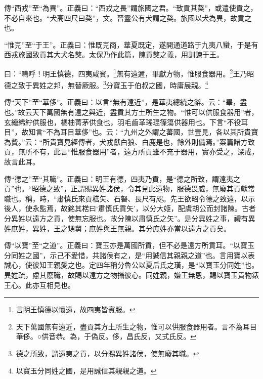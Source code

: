 {\noindent\zhuan{}\fzbyks 傳“西戎”至“為異”。正義曰：“西戎之長”謂旅國之君。“致貢其獒”，或遣使貢之，不必自來也。“犬高四尺曰獒”，文。晉靈公有犬謂之獒。旅國以犬為異，故貢之也。 \par}

{\noindent\shu{}\fzkt “惟克”至“于王”。正義曰：惟既克商，華夏既定，遂開通道路于九夷八蠻，于是有西戎旅國致貢其大犬名獒。太保乃作此篇，陳貢獒之義，用訓諫于王。 \par}

曰：“嗚呼！明王慎德，四夷咸賓。\footnote{言明王慎德以懷遠，故四夷皆賓服。}無有遠邇，畢獻方物，惟服食器用。\footnote{天下萬國無有遠近，盡貢其方土所生之物，惟可以供服食器用者。言不為耳目華侈。○供音恭。為，于偽反。侈，昌氏反，又式氏反。}王乃昭德之致于異姓之邦，無替厥服。\footnote{德之所致，謂遠夷之貢，以分賜異姓諸侯，使無廢其職。}分寶玉于伯叔之國，時庸展親。\footnote{以寶玉分同姓之國，是用誠信其親親之道。}


{\noindent\zhuan{}\fzbyks 傳“天下”至“華侈”。正義曰：以言“無有遠近”，是華夷總統之辭。云：“畢，盡也。”故云天下萬國無有遠之與近，盡貢其方土所生之物。“惟可以供服食器用”者，玄纁絺紵供服也，橘柚菁茅供食也，羽毛齒革瑤琨篠簜供器用也。下言“不役耳目”，故知言“不為耳目華侈”也。云：“九州之外謂之蕃國，世壹見，各以其所貴寶為贄。”云：“所貴寶見經傳者，犬戎獻白狼、白鹿是也，餘外則備焉。”案篇諸方致貢，無所不有，此言“惟服食器用”者，遠方所貢雖不充于器用，實亦受之，深戒，故言此耳。 \par}

{\noindent\zhuan{}\fzbyks 傳“德之”至“其職”。正義曰：明王有德，四夷乃貢，是“德之所致，謂遠夷之貢”也。“昭德之致”，正謂賜異姓諸侯，令其見此遠物，服德畏威，無廢其貢獻常職也。稱，時，“肅慎氏來貢楛矢、石砮、長尺有咫。先王欲昭令德之致遠，以示後人，使永監焉，故銘其楛曰‘肅慎氏貢矢’，以分大姬，配虞胡公而封諸陳。古者分異姓以遠方之貢，使無忘服也。故分陳以肅慎氏之矢”。是分異姓之事，禮有異姓庶姓，異姓，王之甥舅；庶姓與王無親。其分庶姓亦當以遠方之貢矣。 \par}

{\noindent\zhuan{}\fzbyks 傳“以寶”至“之道”。正義曰：寶玉亦是萬國所貢，但不必是遠方所貢耳。“以寶玉分同姓之國”，示己不愛惜，共諸侯有之，是“用誠信其親親之道”也。言用寶以表誠心，使彼知王親愛之也。定四年稱分魯公以夏后氏之璜，是“以寶玉分同姓”也。異姓疏，慮其廢職，故賜以遠方之物攝彼心。同姓親，嫌王無恩，賜以寶玉貴物錶王心。此亦互相見也。 \par}

